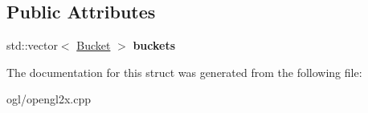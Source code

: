 \subsection*{Public Attributes}
\begin{DoxyCompactItemize}
\item 
\hypertarget{struct_tempest_1_1_opengl2x_1_1_device_1_1_f_b_os_a40761b3d51c374c2447596b93cedaefb}{std\+::vector$<$ \hyperlink{struct_tempest_1_1_opengl2x_1_1_device_1_1_f_b_os_1_1_bucket}{Bucket} $>$ {\bfseries buckets}}\label{struct_tempest_1_1_opengl2x_1_1_device_1_1_f_b_os_a40761b3d51c374c2447596b93cedaefb}

\end{DoxyCompactItemize}


The documentation for this struct was generated from the following file\+:\begin{DoxyCompactItemize}
\item 
ogl/opengl2x.\+cpp\end{DoxyCompactItemize}
